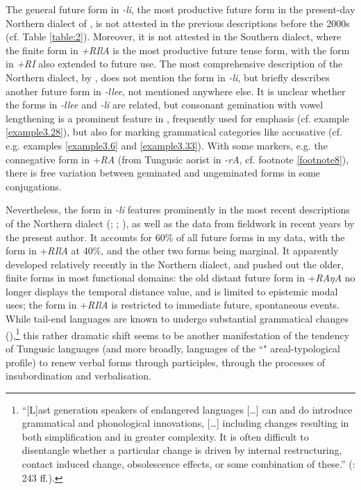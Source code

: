 \documentclass[output=paper,colorlinks,citecolor=brown]{langscibook}
\begin{document}
The general future form in \textit{-li}, the most productive future form in the present-day Northern dialect of , is not attested in the previous descriptions before the 2000s (cf. Table \ref{table:2}). Moreover, it is not attested in the Southern dialect, where the finite form in \textit{+RIlA} is the most productive future tense form, with the form in \textit{+RI} also extended to future use. The most comprehensive description of the Northern dialect, by \citet{Petrova_1967}, does not mention the form in \textit{-li}, but briefly describes another future form in \textit{-llee}, not mentioned anywhere else. It is unclear whether the forms in \textit{-llee} and \textit{-li} are related, but consonant gemination with vowel lengthening is a prominent feature in , frequently used for emphasis (cf. example \ref{example3.28}), but also for marking grammatical categories like accusative (cf. e.g. examples \ref{example3.6} and \ref{example3.33}). With some markers, e.g. the connegative form in +\textit{RA} (from Tungusic aorist in \textit{-rA}, cf. footnote \ref{footnote8}), there is free variation between geminated and ungeminated forms in some conjugations.

Nevertheless, the form in \textit{-li} features prominently in the most recent descriptions of the Northern dialect (\citealt{Pevnov_2016}; \citealt{Yamada_2010b}; \citeyear{Yamada_2013}), as well as the data from fieldwork in recent years by the present author. It accounts for 60\% of all future forms in my data, with the form in +\textit{RIlA} at 40\%, and the other two forms being marginal. It apparently developed relatively recently in the Northern dialect, and pushed out the older, finite forms in most functional domains: the old distant future form in +\textit{RAŋA} no longer displays the temporal distance value,  and is limited to epistemic modal uses; the form in +\textit{RIlA} is restricted to immediate future, spontaneous events. While tail-end languages are known to undergo substantial grammatical changes (\citealt{Harrison_Anderson_2008}),\footnote{“[L]ast generation speakers of endangered languages […] can and do introduce grammatical and phonological innovations, […] including changes resulting in both simplification and in greater complexity. It is often difficult to disentangle whether a particular change is driven by internal restructuring, contact induced change, obsolescence effects, or some combination of these.” (\citealt{Harrison_Anderson_2008}: 243 ff.).} this rather dramatic shift seems to be another manifestation of the tendency of Tungusic languages (and more broadly, languages of the ``" areal-typological profile) to renew verbal forms through participles, through the processes of insubordination and verbalisation.
\end{document}
